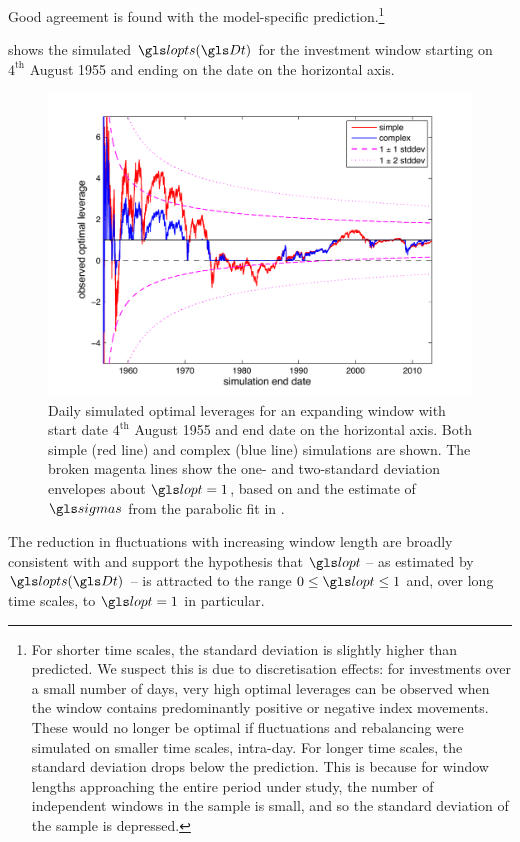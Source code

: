 Good agreement is found with the model-specific prediction.\footnote{For shorter time scales, the standard deviation is slightly higher than predicted. We suspect this is due to discretisation effects: for investments over a small number of days, very high optimal leverages can be observed when the window contains predominantly positive or negative index movements. These would no longer be optimal if fluctuations and rebalancing were simulated on smaller time scales, \ie intra-day. For longer time scales, the standard deviation drops below the prediction. This is because for window lengths approaching the entire period under study, the number of independent windows in the sample is small, and so the standard deviation of the sample is depressed.}

 shows the simulated $\lopts(\Dt)$ for the investment window starting on $4^\text{th}$ August 1955 and ending on the date on the horizontal axis.
\begin{figure}
\includegraphics[width=\textwidth]{./chapter_4/figs/sme_fig4.pdf}
\caption{Daily simulated optimal leverages for an expanding window with start date $4^\text{th}$ August 1955 and end date on the horizontal axis. Both simple (red line) and complex (blue line) simulations are shown. The broken magenta lines show the one- and two-standard deviation envelopes about $\lopt=1$, based on  and the estimate of $\sigmas$ from the parabolic fit in .}
\end{figure}
The reduction in fluctuations with increasing window length are broadly consistent with  and support the hypothesis that $\lopt$ -- as estimated by $\lopts(\Dt)$ -- is attracted to the range $0\leq\lopt\leq1$ and, over long time scales, to $\lopt=1$ in particular.

